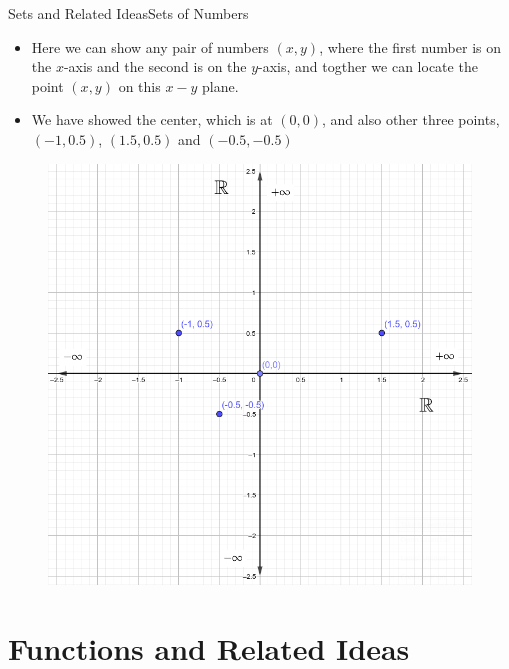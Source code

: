 \documentclass[8pt,usepdftitle=false]{beamer}
\begin{document}
\begin{frame}[allowframebreaks]{Sets and Related Ideas}{Sets of Numbers}
\begin{itemize}
\begin{itemize}
\item Here we can show any pair of numbers $(x, y)$, where the first number is on the $x$-axis and the second is on the $y$-axis, and togther we can locate the point $(x, y)$ on this $x-y$ plane.


\item We have showed the center, which is at $(0, 0)$, and also other three points,  $(-1, 0.5)$, $(1.5, 0.5)$ and $(-0.5, -0.5)$

\end{itemize}



\begin{figure}
\centering
\includegraphics[scale = .25]{Images/cartesian_coordinate.png}
\end{figure}




\end{itemize}
\end{frame}





\section{Functions and Related Ideas}
\frame{\sectionpage}
\end{document}
